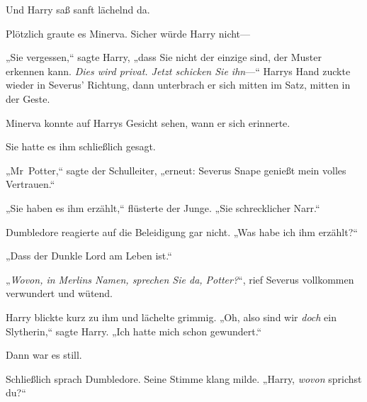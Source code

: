 Und Harry saß sanft lächelnd da.

Plötzlich graute es Minerva. Sicher würde Harry nicht—

„Sie vergessen,“ sagte Harry, „dass Sie nicht der einzige sind, der Muster erkennen kann. \emph{Dies wird privat. Jetzt schicken Sie ihn}—“ Harrys Hand zuckte wieder in Severus’ Richtung, dann unterbrach er sich mitten im Satz, mitten in der Geste.

Minerva konnte auf Harrys Gesicht sehen, wann er sich erinnerte.

Sie hatte es ihm schließlich gesagt.

„Mr~Potter,“ sagte der Schulleiter, „erneut: Severus Snape genießt mein volles Vertrauen.“

„Sie haben es ihm erzählt,“ flüsterte der Junge. „Sie schrecklicher Narr.“

Dumbledore reagierte auf die Beleidigung gar nicht. „Was habe ich ihm erzählt?“

„Dass der Dunkle Lord am Leben ist.“

„\emph{Wovon, in Merlins Namen, sprechen Sie da, Potter?}“, rief Severus vollkommen verwundert und wütend.

Harry blickte kurz zu ihm und lächelte grimmig. „Oh, also sind wir \emph{doch} ein Slytherin,“ sagte Harry. „Ich hatte mich schon gewundert.“

Dann war es still.

Schließlich sprach Dumbledore. Seine Stimme klang milde. „Harry, \emph{wovon} sprichst du?“

